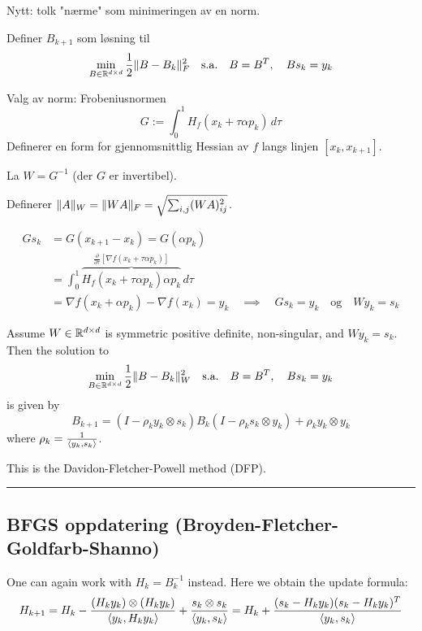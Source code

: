 Nytt: tolk "nærme" som minimeringen av en norm.

Definer \( B_{k+1} \) som løsning til
\[
  \min_{B \in \mathbb{R}^{d \times d}} \frac{1}{2} \lVert B - B_k\rVert_F^2 \quad \text{s.a.} \quad B = B^T, \quad B s_k = y_k
\]

Valg av norm: Frobeniusnormen
\[
  G := \int_0^1 H_f(x_k + \tau \alpha p_k) \, d\tau
\]
Definerer en form for gjennomsnittlig Hessian av \( f \) langs linjen \([x_k, x_{k+1}]\).

La \( W = G^{-1} \) (der \( G \) er invertibel).

Definerer \( \lVert A\rVert_W = \lVert WA\rVert_F = \sqrt{\sum_{i,j} (W A)_{ij}^2} \).

\begin{remark}{}{}
  \begin{align*}
    Gs_k & = G(x_{k+1} - x_k) = G(\alpha p_k)                                                                                                                 \\
         & = \int_0^1 \overbrace{H_f(x_k + \tau \alpha p_k) \alpha p_k}^{\frac{\partial}{\partial \tau}\left[\nabla f(x_k + \tau \alpha p_k)\right]} \, d\tau \\
         & = \nabla f(x_k + \alpha p_k) - \nabla f(x_k) = y_k \quad \implies \quad Gs_k = y_k \quad \text{og} \quad W y_k = s_k
  \end{align*}
\end{remark}

\begin{theorem}{}{}
  Assume \(W\in \mathbb{R}^{d \times d}\) is symmetric positive definite, non-singular, and \(W y_k = s_k\). Then the solution to
  \[
    \min_{B \in \mathbb{R}^{d \times d}} \frac{1}{2} \lVert B - B_k\rVert_W^2 \quad \text{s.a.} \quad B = B^T, \quad B s_k = y_k
  \]
  is given by
  \[
    B_{k+1} = \left(I - \rho_k y_k \otimes s_k\right) B_k \left(I - \rho_k s_k \otimes y_k\right) + \rho_k y_k \otimes y_k
  \]
  where \( \rho_k = \frac{1}{\langle y_k, s_k\rangle} \).

  This is the Davidon-Fletcher-Powell method (DFP).
\end{theorem}

\hrule
\vspace{1em}

\subsection*{BFGS oppdatering (Broyden-Fletcher-Goldfarb-Shanno)}

One can again work with \(H_k = B_k^{-1}\) instead.
Here we obtain the update formula:
\[
  H_{k+1} = H_k - \frac{\left(H_k y_k\right) \otimes \left(H_k y_k\right)}{\langle y_k, H_k y_k\rangle} + \frac{s_k \otimes s_k}{\langle y_k, s_k\rangle}
  = H_k + \frac{(s_k - H_k y_k)(s_k - H_k y_k)^T}{\langle y_k, s_k\rangle}
\]

